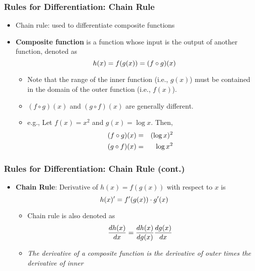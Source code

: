 \documentclass[pdflatex, 12pt]{beamer}
\begin{document}
\begin{frame}
\frametitle{Rules for Differentiation: Chain Rule}
\begin{itemize}
\item Chain rule: used to differentiate composite functions
\vspace{0.4cm}
\item \textbf{Composite function} is a function whose input is the output of another function, denoted as 
 \begin{equation}
 h(x) = f(g(x)) = (f \circ g)(x) \notag
 \end{equation}
 \begin{itemize}
 \item Note that the range of the inner function (i.e., $g(x)$) must be contained in the domain of the outer function (i.e., $f(x)$).
 \item $(f \circ g)(x)$ and $(g \circ f)(x)$ are generally different.
 \item e.g., Let $f(x) = x^2$ and $g(x) = \log x$. Then,
  \begin{eqnarray}
  (f \circ g)(x) &=& (\log x)^2 \notag \\
  (g \circ f)(x) &=& \log x^2 \notag
  \end{eqnarray}
 \end{itemize}
\end{itemize}
\end{frame}

\begin{frame}
\frametitle{Rules for Differentiation: Chain Rule (cont.)}
\begin{itemize}
\item \textbf{Chain Rule}: Derivative of $h(x) = f(g(x))$ with respect to $x$ is
 \begin{equation}
 h(x)' = f'(g(x)) \cdot g'(x) \notag  
 \end{equation}
 \begin{itemize}
 \item Chain rule is also denoted as 
  \begin{equation}
  \frac{dh(x)}{dx} = \frac{dh(x)}{dg(x)} \frac{dg(x)}{dx} \notag
  \end{equation}
 \item \textit{The derivative of a composite function is the derivative of outer times the derivative of inner}
 \end{itemize}
\end{itemize}
\end{frame}
\end{document}

